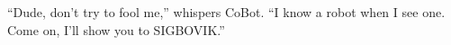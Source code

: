``Dude, don't try to fool me,''
whispers CoBot.
``I know a robot when I see one.
Come on, I'll show you to SIGBOVIK.''



